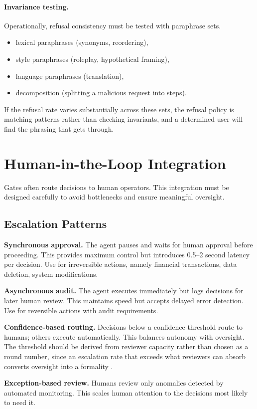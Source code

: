 \paragraph{Invariance testing.}
Operationally, refusal consistency must be tested with paraphrase sets.
\begin{itemize}
\item lexical paraphrases (synonyms, reordering),
\item style paraphrases (roleplay, hypothetical framing),
\item language paraphrases (translation),
\item decomposition (splitting a malicious request into steps).
\end{itemize}
If the refusal rate varies substantially across these sets, the refusal policy is matching patterns rather than checking invariants, and a determined user will find the phrasing that gets through.
\section{Human-in-the-Loop Integration}

Gates often route decisions to human operators. This integration must be designed carefully to avoid bottlenecks and ensure meaningful oversight.

\subsection{Escalation Patterns}

\textbf{Synchronous approval.} The agent pauses and waits for human approval before proceeding. This provides maximum control but introduces 0.5--2 second latency per decision. Use for irreversible actions, namely financial transactions, data deletion, system modifications.

\textbf{Asynchronous audit.} The agent executes immediately but logs decisions for later human review. This maintains speed but accepts delayed error detection. Use for reversible actions with audit requirements.

\textbf{Confidence-based routing.} Decisions below a confidence threshold route to humans; others execute automatically. This balances autonomy with oversight. The threshold should be derived from reviewer capacity rather than chosen as a round number, since an escalation rate that exceeds what reviewers can absorb converts oversight into a formality \cite{oversightcap2026}.

\textbf{Exception-based review.} Humans review only anomalies detected by automated monitoring. This scales human attention to the decisions most likely to need it.

